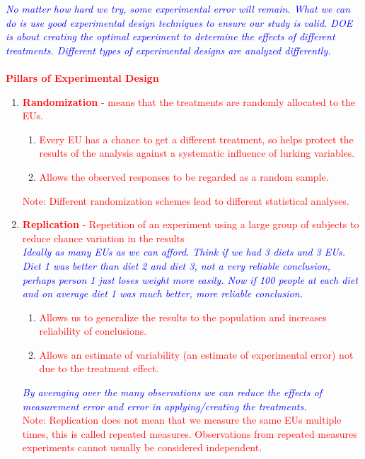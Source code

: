 \newpage

\noindent\textit{\textcolor{blue}{No matter how hard we try, some experimental error will remain. What we can do is use good experimental design techniques to ensure our study is valid.
DOE is about creating the optimal experiment to determine the effects of different treatments.  Different types of experimental designs are analyzed differently.}}\\~\\
\textcolor{red}{\textbf{Pillars of Experimental Design}}
\begin{enumerate}
		\item \textcolor{red}{\textbf{Randomization} - means that the treatments are randomly allocated to the EUs.}
			\begin{enumerate}
				\item \textcolor{red}{Every EU has a chance to get a different treatment, so helps protect the results of the analysis against a systematic influence of lurking variables.  }
				\item \textcolor{red}{Allows the observed responses to be regarded as a random sample.}
			\end{enumerate}
		\textcolor{red}{Note: Different randomization schemes lead to different statistical analyses.}
		\item \textcolor{red}{\textbf{Replication} - Repetition of an experiment using a large group of subjects to reduce chance variation in the results}\\
\noindent\textit{\textcolor{blue}{Ideally as many EUs as we can afford.  Think if we had 3 diets and 3 EUs.  Diet 1 was better than diet 2 and diet 3, not a very reliable conclusion, perhaps person 1 just loses weight more easily.  Now if 100 people at each diet and on average diet 1 was much better, more reliable conclusion.}}
\begin{enumerate}
				\item \textcolor{red}{Allows us to generalize the results to the population and increases reliability of conclusions. }
				\item \textcolor{red}{Allows an estimate of variability (an estimate of experimental error) not due to the treatment effect.}
			\end{enumerate}
\noindent\textit{\textcolor{blue}{By averaging over the many observations we can reduce the effects of measurement error and error in applying/creating the treatments.}}\\
	\textcolor{red}{Note: Replication does not mean that we measure the same EUs multiple times, this is called repeated measures.  Observations from repeated measures experiments cannot 	usually be considered independent.}

\end{enumerate}
